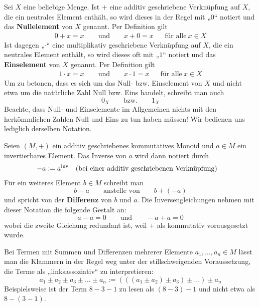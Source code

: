 \begin{nota}  
    Sei $X$ eine beliebige Menge. Ist $+$ eine additiv geschriebene Verknüpfung auf $X$, die ein neutrales Element enthält, so wird dieses in der Regel mit „$0$“ notiert und das \textbf{Nullelement} von $X$ genannt. Per Definition gilt
    \begin{align*}
        0 + x = x \qquad\text{und}\qquad x+0= x && \text{für alle}\ x\in X
    \end{align*}
    Ist dagegen „$\cdot$“ eine multiplikativ geschriebene Verknüpfung auf $X$, die ein neutrales Element enthält, so wird dieses oft mit „$1$“ notiert und das \textbf{Einselement} von $X$ genannt. Per Definition gilt
    \begin{align*}
        1 \cdot x = x \qquad\text{und}\qquad x\cdot 1= x && \text{für alle}\ x\in X
    \end{align*}
    Um zu betonen, dass es sich um das Null- bzw. Einselement von $X$ und nicht etwa um die natürliche Zahl Null bzw. Eins handelt, schreibt man auch
    \[ 0_X \qquad\text{bzw.}\qquad 1_X \]
    Beachte, dass Null- und Einselemente im Allgemeinen nichts mit den herkömmlichen Zahlen Null und Eins zu tun haben müssen! Wir bedienen uns lediglich derselben Notation.
\end{nota}


\begin{nota}[Differenzen] \label{differenz}
    Seien $(M,+)$ ein additiv geschriebenes kommutatives Monoid und $a\in M$ ein invertierbares Element. Das Inverse von $a$ wird dann notiert durch
    \begin{align*}
        -a & := a^{\mathrm{inv}} && (\text{bei einer additiv geschriebenen Verknüpfung})
    \end{align*}
    Für ein weiteres Element $b\in M$ schreibt man
        \[ b-a \qquad\text{anstelle von}\qquad b + (-a) \]
    und spricht von der \textbf{Differenz} von $b$ und $a$. Die Inversengleichungen nehmen mit dieser Notation die folgende Gestalt an:
        \[ a-a = 0 \qquad\text{und}\qquad -a+a = 0 \]
    wobei die zweite Gleichung redundant ist, weil $+$ als kommutativ vorausgesetzt wurde.
    
    Bei Termen mit Summen und Differenzen mehrerer Elemente $a_1,\dots , a_n\in M$ lässt man die Klammern in der Regel weg unter der stillschweigenden Voraussetzung, die Terme als „linksassoziativ“ zu interpretieren:
        \[ a_1 \pm a_2\pm a_3\pm\ldots\pm a_n := (((a_1\pm a_2)\pm a_3) \pm \ldots ) \pm a_n\]
    Beispielsweise ist der Term $8-3-1$ zu lesen als $(8-3)-1$ und nicht etwa als $8-(3-1)$.
\end{nota}


